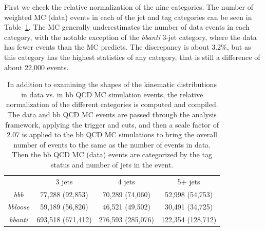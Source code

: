 First we check the relative normalization of the nine categories.
The number of weighted MC (data) events in each of the jet and tag
categories can be seen in Table~\ref{tab:bb_qcd_mc_categories}.  The MC
generally underestimates the number of data events in each category,
with the notable exception of the \textit{bbanti} 3-jet category, where 
the data has fewer events than the MC predicts.  The discrepancy is about
3.2\%, but as this category has the highest statistics of any category,
that is still a difference of about 22,000 events.

\begin{table}
    \begin{center}
    \caption{In addition to examining the shapes of the kinematic distributions
    in data vs. in bb QCD MC simulation events, the relative normalization of the different categories
    is computed and compiled.  The data and bb QCD MC events are passed through the analysis
    framework, applying the trigger and cuts, and then a scale factor of 2.07 is applied
    to the bb QCD MC simulations to bring the overall number of events to the same as the number of
    events in data.  Then the bb QCD MC (data) events are categorized by the tag status
    and number of jets in the event. \label{tab:bb_qcd_mc_categories}}
        \begin{tabular}{ c c c c }
                         & 3 jets            & 4 jets            & 5+ jets \\
        \textit{bbb}     & 77,288 (92,853)   & 70,289 (74,060)   & 52,998 (54,753) \\
        \textit{bbloose} & 59,189 (56,826)   & 46,521 (49,502)   & 30,491 (34,725) \\
        \textit{bbanti}  & 693,518 (671,412) & 276,593 (285,076) & 122,354 (128,712) \\
        \end{tabular}
    \end{center}
\end{table}




